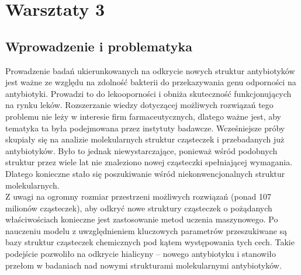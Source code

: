 \chapter{Warsztaty 3}
\section{Wprowadzenie i problematyka}
Prowadzenie badań ukierunkowanych na odkrycie nowych struktur antybiotyków jest ważne ze względu na zdolność bakterii do przekazywania genu odporności na antybiotyki. Prowadzi to do lekooporności i obniża skuteczność funkcjonujących na rynku leków. Rozszerzanie wiedzy dotyczącej możliwych rozwiązań tego problemu nie leży w interesie firm farmaceutycznych, dlatego ważne jest, aby tematyka ta była podejmowana przez instytuty badawcze. Wcześniejsze próby skupiały się na analizie molekularnych struktur cząsteczek i przebadanych już antybiotyków. Było to jednak niewystarczające, ponieważ wśród podobnych struktur przez wiele lat nie znaleziono nowej cząsteczki spełniającej wymagania. Dlatego konieczne stało się poszukiwanie wśród niekonwencjonalnych struktur molekularnych. \\
Z uwagi na ogromny rozmiar przestrzeni możliwych rozwiązań (ponad 107 milionów cząsteczek), aby odkryć nowe struktury cząsteczek o pożądanych właściwościach konieczne jest zastosowanie metod uczenia maszynowego. Po nauczeniu modelu z uwzględnieniem kluczowych parametrów przeszukiwane są bazy struktur cząsteczek chemicznych pod kątem występowania tych cech. Takie podejście pozwoliło na odkrycie hialicyny – nowego antybiotyku i stanowiło przełom w badaniach nad nowymi strukturami molekularnymi antybiotyków.


